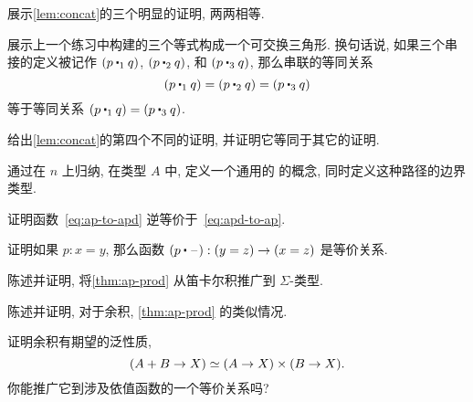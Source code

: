 \sectionExercises

\begin{ex}
    \label{ex:basics:concat}
    展示\cref{lem:concat}的三个明显的证明, 两两相等.
\end{ex}

\begin{ex}
    \label{ex:eq-proofs-commute}
    展示上一个练习中构建的三个等式构成一个可交换三角形.
    换句话说, 如果三个串接的定义被记作 $(p \mathbin{\ct_1} q)$, $(p\mathbin{\ct_2} q)$, 和 $(p\mathbin{\ct_3} q)$, 那么串联的等同关系
    \[(p\mathbin{\ct_1} q) = (p\mathbin{\ct_2} q) = (p\mathbin{\ct_3} q)\]
    等于等同关系 $(p\mathbin{\ct_1} q) = (p\mathbin{\ct_3} q)$.
\end{ex}

\begin{ex}
    \label{ex:fourth-concat}
    给出\cref{lem:concat}的第四个不同的证明, 并证明它等同于其它的证明.
\end{ex}

\begin{ex}
    \label{ex:npaths}
    通过在 $n$ 上归纳, 在类型 $A$ 中, 定义一个通用的  的概念, 同时定义这种路径的边界类型.
\end{ex}

\begin{ex}
    \label{ex:ap-to-apd-equiv-apd-to-ap}
    证明函数~\eqref{eq:ap-to-apd} 逆等价于~\eqref{eq:apd-to-ap}.
\end{ex}

\begin{ex}
    \label{ex:equiv-concat}
    证明如果 $p:x=y$, 那么函数 $(p\ct \blank):(y=z) \to (x=z)$ 是等价关系.
\end{ex}

\begin{ex}
    \label{ex:ap-sigma}
    陈述并证明, 将\cref{thm:ap-prod} 从笛卡尔积推广到 $\Sigma$-类型.
\end{ex}

\begin{ex}
    \label{ex:ap-coprod}
    陈述并证明, 对于余积, \cref{thm:ap-prod} 的类似情况.
\end{ex}

\begin{ex}
    \label{ex:coprod-ump}
    证明余积有期望的泛性质,
    \[ (A+B \to X) \simeq (A\to X)\times (B\to X). \]
    你能推广它到涉及依值函数的一个等价关系吗?
\end{ex}


